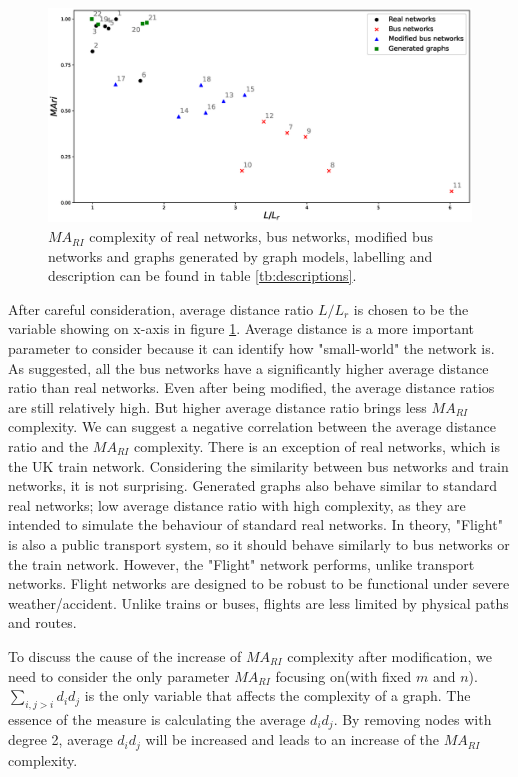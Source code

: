 \documentclass[12pt]{article}
\begin{document}
\begin{figure}[ht]
    \includegraphics[width = \textwidth]{real_networks.eps}
    \caption{$MA_{RI}$ complexity of real networks, bus networks, modified bus networks and graphs generated by graph models, labelling and description can be found in table \ref{tb:descriptions}.}
    \label{fig:real_networks}
\end{figure}
\par
After careful consideration, average distance ratio $L/L_r$ is chosen to be the variable showing on x-axis in figure \ref{fig:real_networks}. Average distance is a more important parameter to consider because it can identify how "small-world" the network is. As suggested, all the bus networks have a significantly higher average distance ratio than real networks. Even after being modified, the average distance ratios are still relatively high. But higher average distance ratio brings less $MA_{RI}$ complexity. We can suggest a negative correlation between the average distance ratio and the $MA_{RI}$ complexity. There is an exception of real networks, which is the UK train network. Considering the similarity between bus networks and train networks, it is not surprising. Generated graphs also behave similar to standard real networks; low average distance ratio with high complexity, as they are intended to simulate the behaviour of standard real networks. In theory, "Flight" is also a public transport system, so it should behave similarly to bus networks or the train network. However, the "Flight" network performs, unlike transport networks. Flight networks are designed to be robust\cite{zhixing2021recent} to be functional under severe weather/accident. Unlike trains or buses, flights are less limited by physical paths and routes.\par
To discuss the cause of the increase of $MA_{RI}$ complexity after modification, we need to consider the only parameter $MA_{RI}$ focusing on(with fixed $m$ and $n$). $\sum_{i,j>i}d_id_j$ is the only variable that affects the complexity of a graph. The essence of the measure is calculating the average $d_id_j$. By removing nodes with degree 2, average $d_id_j$ will be increased and leads to an increase of the $MA_{RI}$ complexity.
\end{document}
